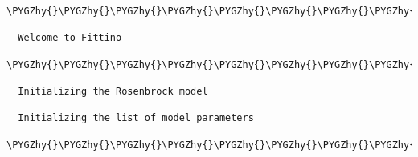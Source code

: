\documentclass[letterpaper,10pt,english]{sphinxmanual}
\def\PYGZhy{\char`\-}
\begin{document}
\begin{Verbatim}[commandchars=\\\{\}]
\PYGZhy{}\PYGZhy{}\PYGZhy{}\PYGZhy{}\PYGZhy{}\PYGZhy{}\PYGZhy{}\PYGZhy{}\PYGZhy{}\PYGZhy{}\PYGZhy{}\PYGZhy{}\PYGZhy{}\PYGZhy{}\PYGZhy{}\PYGZhy{}\PYGZhy{}\PYGZhy{}\PYGZhy{}\PYGZhy{}\PYGZhy{}\PYGZhy{}\PYGZhy{}\PYGZhy{}\PYGZhy{}\PYGZhy{}\PYGZhy{}\PYGZhy{}\PYGZhy{}\PYGZhy{}\PYGZhy{}\PYGZhy{}\PYGZhy{}\PYGZhy{}\PYGZhy{}\PYGZhy{}\PYGZhy{}\PYGZhy{}\PYGZhy{}\PYGZhy{}\PYGZhy{}\PYGZhy{}\PYGZhy{}\PYGZhy{}\PYGZhy{}\PYGZhy{}\PYGZhy{}\PYGZhy{}\PYGZhy{}\PYGZhy{}\PYGZhy{}\PYGZhy{}\PYGZhy{}\PYGZhy{}\PYGZhy{}\PYGZhy{}\PYGZhy{}\PYGZhy{}\PYGZhy{}\PYGZhy{}\PYGZhy{}\PYGZhy{}\PYGZhy{}\PYGZhy{}\PYGZhy{}\PYGZhy{}\PYGZhy{}\PYGZhy{}\PYGZhy{}\PYGZhy{}\PYGZhy{}\PYGZhy{}\PYGZhy{}\PYGZhy{}\PYGZhy{}\PYGZhy{}\PYGZhy{}\PYGZhy{}\PYGZhy{}\PYGZhy{}\PYGZhy{}\PYGZhy{}\PYGZhy{}\PYGZhy{}\PYGZhy{}\PYGZhy{}\PYGZhy{}

  Welcome to Fittino

\PYGZhy{}\PYGZhy{}\PYGZhy{}\PYGZhy{}\PYGZhy{}\PYGZhy{}\PYGZhy{}\PYGZhy{}\PYGZhy{}\PYGZhy{}\PYGZhy{}\PYGZhy{}\PYGZhy{}\PYGZhy{}\PYGZhy{}\PYGZhy{}\PYGZhy{}\PYGZhy{}\PYGZhy{}\PYGZhy{}\PYGZhy{}\PYGZhy{}\PYGZhy{}\PYGZhy{}\PYGZhy{}\PYGZhy{}\PYGZhy{}\PYGZhy{}\PYGZhy{}\PYGZhy{}\PYGZhy{}\PYGZhy{}\PYGZhy{}\PYGZhy{}\PYGZhy{}\PYGZhy{}\PYGZhy{}\PYGZhy{}\PYGZhy{}\PYGZhy{}\PYGZhy{}\PYGZhy{}\PYGZhy{}\PYGZhy{}\PYGZhy{}\PYGZhy{}\PYGZhy{}\PYGZhy{}\PYGZhy{}\PYGZhy{}\PYGZhy{}\PYGZhy{}\PYGZhy{}\PYGZhy{}\PYGZhy{}\PYGZhy{}\PYGZhy{}\PYGZhy{}\PYGZhy{}\PYGZhy{}\PYGZhy{}\PYGZhy{}\PYGZhy{}\PYGZhy{}\PYGZhy{}\PYGZhy{}\PYGZhy{}\PYGZhy{}\PYGZhy{}\PYGZhy{}\PYGZhy{}\PYGZhy{}\PYGZhy{}\PYGZhy{}\PYGZhy{}\PYGZhy{}\PYGZhy{}\PYGZhy{}\PYGZhy{}\PYGZhy{}\PYGZhy{}\PYGZhy{}\PYGZhy{}\PYGZhy{}\PYGZhy{}\PYGZhy{}\PYGZhy{}

  Initializing the Rosenbrock model

  Initializing the list of model parameters

\PYGZhy{}\PYGZhy{}\PYGZhy{}\PYGZhy{}\PYGZhy{}\PYGZhy{}\PYGZhy{}\PYGZhy{}\PYGZhy{}\PYGZhy{}\PYGZhy{}\PYGZhy{}\PYGZhy{}\PYGZhy{}\PYGZhy{}\PYGZhy{}\PYGZhy{}\PYGZhy{}\PYGZhy{}\PYGZhy{}\PYGZhy{}\PYGZhy{}\PYGZhy{}\PYGZhy{}\PYGZhy{}\PYGZhy{}\PYGZhy{}\PYGZhy{}\PYGZhy{}\PYGZhy{}\PYGZhy{}\PYGZhy{}\PYGZhy{}\PYGZhy{}\PYGZhy{}\PYGZhy{}\PYGZhy{}\PYGZhy{}\PYGZhy{}\PYGZhy{}\PYGZhy{}\PYGZhy{}\PYGZhy{}\PYGZhy{}\PYGZhy{}\PYGZhy{}\PYGZhy{}\PYGZhy{}\PYGZhy{}\PYGZhy{}\PYGZhy{}\PYGZhy{}\PYGZhy{}\PYGZhy{}\PYGZhy{}\PYGZhy{}\PYGZhy{}\PYGZhy{}\PYGZhy{}\PYGZhy{}\PYGZhy{}\PYGZhy{}\PYGZhy{}\PYGZhy{}\PYGZhy{}\PYGZhy{}\PYGZhy{}\PYGZhy{}\PYGZhy{}\PYGZhy{}\PYGZhy{}\PYGZhy{}\PYGZhy{}\PYGZhy{}\PYGZhy{}\PYGZhy{}\PYGZhy{}\PYGZhy{}\PYGZhy{}\PYGZhy{}\PYGZhy{}\PYGZhy{}\PYGZhy{}\PYGZhy{}\PYGZhy{}\PYGZhy{}\PYGZhy{}


\end{Verbatim}
\end{document}
